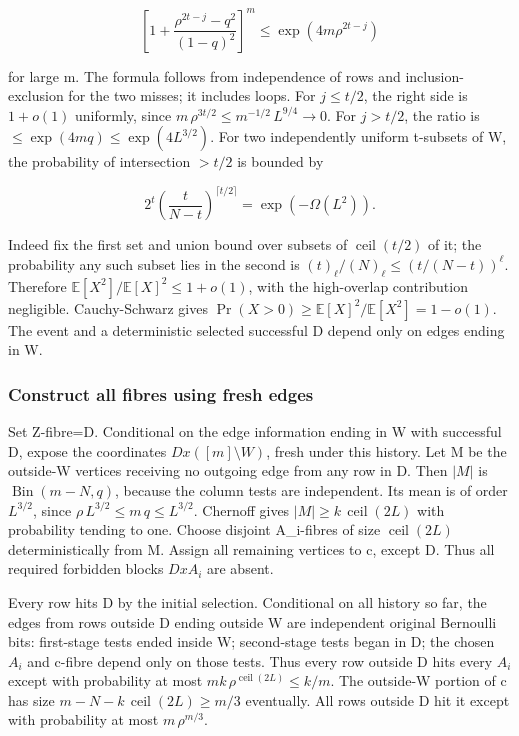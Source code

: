 \documentclass[11pt]{article}
\begin{document}
\[
\left[1+\frac{\rho^{2t-j}-q^2}{(1-q)^2}\right]^m
\leq\exp(4m\rho^{2t-j})
\]

for large m. The formula follows from independence of rows and inclusion-exclusion for the two misses; it includes loops. For $j\leq t/2$, the right side is $1+o(1)$ uniformly, since $m\,\rho ^{3t/2}\leq m^{-1/2}\,L^{9/4}\to 0$. For $j>t/2$, the ratio is $\leq \exp (4m q)\leq \exp (4L^{3/2})$. For two independently uniform t-subsets of W, the probability of intersection $>t/2$ is bounded by

\[
2^t\left(\frac{t}{N-t}\right)^{\lceil t/2\rceil}=\exp(-\Omega(L^2)).
\]

Indeed fix the first set and union bound over subsets of $\operatorname{ceil}(t/2)$ of it; the probability any such subset lies in the second is $(t)_{\ell }/(N)_{\ell } \leq (t/(N-t))^{\ell }$. Therefore $\mathbb E[X^{2}]/\mathbb E[X]^{2}\leq 1+o(1)$, with the high-overlap contribution negligible. Cauchy-Schwarz gives $\Pr(X>0)\geq \mathbb E[X]^{2}/\mathbb E[X^{2}]=1-o(1)$. The event and a deterministic selected successful D depend only on edges ending in W.

\subsubsection{Construct all fibres using fresh edges}

Set Z-fibre=D. Conditional on the edge information ending in W with successful D, expose the coordinates $D x ([m] \setminus  W)$, fresh under this history. Let M be the outside-W vertices receiving no outgoing edge from any row in D. Then $|M|$ is $\operatorname{Bin}(m-N,q)$, because the column tests are independent. Its mean is of order $L^{3/2}$, since $\rho \,L^{3/2}\leq m\,q\leq L^{3/2}$. Chernoff gives $|M|\geq k\,\operatorname{ceil}(2L)$ with probability tending to one. Choose disjoint A\_i-fibres of size $\operatorname{ceil}(2L)$ deterministically from M. Assign all remaining vertices to c, except D. Thus all required forbidden blocks $D x A_{i}$ are absent.

Every row hits D by the initial selection. Conditional on all history so far, the edges from rows outside D ending outside W are independent original Bernoulli bits: first-stage tests ended inside W; second-stage tests began in D; the chosen $A_{i}$ and c-fibre depend only on those tests. Thus every row outside D hits every $A_{i}$ except with probability at most $mk\,\rho ^{\operatorname{ceil}(2L)}\leq k/m$. The outside-W portion of c has size $m-N-k\,\operatorname{ceil}(2L)\geq m/3$ eventually. All rows outside D hit it except with probability at most $m\,\rho ^{m/3}$.
\end{document}
